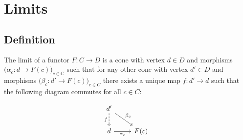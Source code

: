 \section{Limits}

\subsection{Definition}
The limit of a functor $F:C\to D$ is a cone with vertex $d\in D$ and morphisms
$\big(\alpha_c: d \to F(c)\big)_{c\in C}$ such that for any other cone with
vertex $d'\in D$ and morphisms $\big(\beta_c: d' \to F(c)\big)_{c\in C}$ there
exists a unique map $f:d'\to d$ such that the following diagram commutes for all
$c\in C$: \parencite{leinster:basic_category_theory}

\[\begin{tikzcd}
	{d'} \\
	d & {F(c)}
	\arrow["{\alpha_c}"', from=2-1, to=2-2]
	\arrow["{\beta_c}", from=1-1, to=2-2]
	\arrow["f"', dashed, from=1-1, to=2-1]
\end{tikzcd}\]